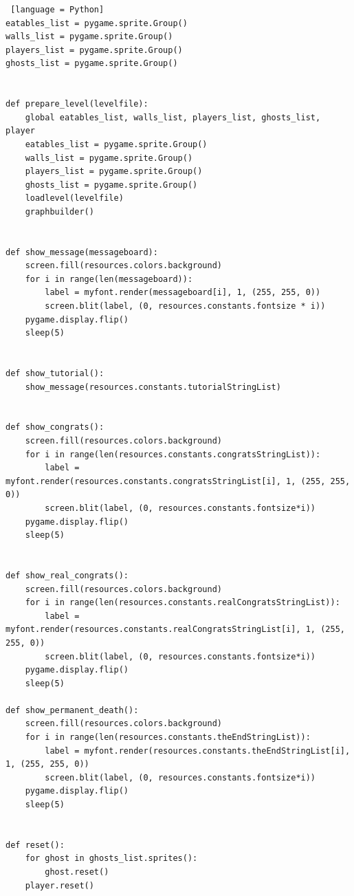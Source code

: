 \documentclass[11pt,a4paper]{report}
\begin{document}
\begin{lstlisting} [language = Python]
eatables_list = pygame.sprite.Group()
walls_list = pygame.sprite.Group()
players_list = pygame.sprite.Group()
ghosts_list = pygame.sprite.Group()


def prepare_level(levelfile):
	global eatables_list, walls_list, players_list, ghosts_list, player
	eatables_list = pygame.sprite.Group()
	walls_list = pygame.sprite.Group()
	players_list = pygame.sprite.Group()
	ghosts_list = pygame.sprite.Group()
	loadlevel(levelfile)
	graphbuilder()


def show_message(messageboard):
	screen.fill(resources.colors.background)
	for i in range(len(messageboard)):
		label = myfont.render(messageboard[i], 1, (255, 255, 0))
		screen.blit(label, (0, resources.constants.fontsize * i))
	pygame.display.flip()
	sleep(5)


def show_tutorial():
	show_message(resources.constants.tutorialStringList)


def show_congrats():
	screen.fill(resources.colors.background)
	for i in range(len(resources.constants.congratsStringList)):
		label = myfont.render(resources.constants.congratsStringList[i], 1, (255, 255, 0))
		screen.blit(label, (0, resources.constants.fontsize*i))
	pygame.display.flip()
	sleep(5)


def show_real_congrats():
	screen.fill(resources.colors.background)
	for i in range(len(resources.constants.realCongratsStringList)):
		label = myfont.render(resources.constants.realCongratsStringList[i], 1, (255, 255, 0))
		screen.blit(label, (0, resources.constants.fontsize*i))
	pygame.display.flip()
	sleep(5)

def show_permanent_death():
	screen.fill(resources.colors.background)
	for i in range(len(resources.constants.theEndStringList)):
		label = myfont.render(resources.constants.theEndStringList[i], 1, (255, 255, 0))
		screen.blit(label, (0, resources.constants.fontsize*i))
	pygame.display.flip()
	sleep(5)


def reset():
	for ghost in ghosts_list.sprites():
		ghost.reset()
	player.reset()



\end{lstlisting}
\end{document}
